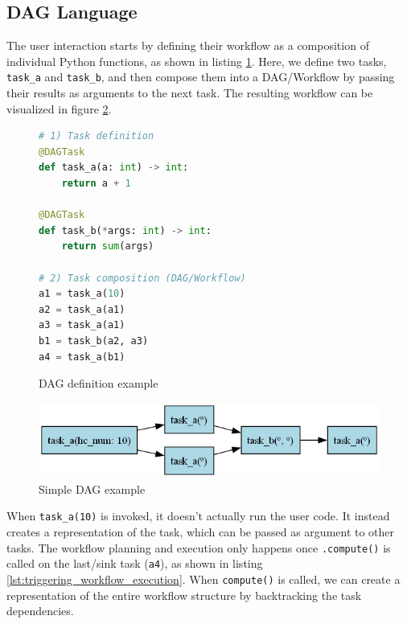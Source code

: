 \documentclass[conference]{IEEEtran}
\begin{document}
\subsection{DAG Language}

The user interaction starts by defining their workflow as a composition of individual Python functions, as shown in listing \ref{lst:dag_lang_example}. Here, we define two tasks, \texttt{task\_a} and \texttt{task\_b}, and then compose them into a DAG/Workflow by passing their results as arguments to the next task. The resulting workflow can be visualized in figure \ref{fig:dag_example}.

\begin{figure}[h]
\centering
\begin{lstlisting}[language=Python, basicstyle=\ttfamily\footnotesize, columns=fullflexible, breaklines=true]
# 1) Task definition
@DAGTask
def task_a(a: int) -> int:
    return a + 1

@DAGTask
def task_b(*args: int) -> int:
    return sum(args)

# 2) Task composition (DAG/Workflow)
a1 = task_a(10)
a2 = task_a(a1)
a3 = task_a(a1)
b1 = task_b(a2, a3)
a4 = task_a(b1)
\end{lstlisting}
\caption{DAG definition example}
\label{lst:dag_lang_example}
\end{figure}

\begin{figure}[h]
    \centering
    \includegraphics[width=\columnwidth]{figures/dag_lang_example.png}
    \caption{Simple DAG example}
    \label{fig:dag_example}
\end{figure}

When \texttt{task\_a(10)} is invoked, it doesn't actually run the user code. It instead creates a representation of the task, which can be passed as argument to other tasks. The workflow planning and execution only happens once \texttt{.compute()} is called on the last/sink task (\texttt{a4}), as shown in listing \ref{lst:triggering_workflow_execution}. When \texttt{compute()} is called, we can create a representation of the entire workflow structure by backtracking the task dependencies.
\end{document}
